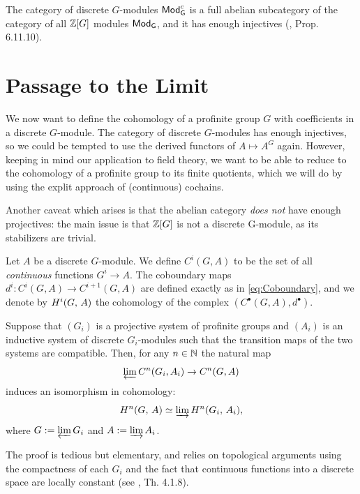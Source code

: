 \documentclass[a4paper, oneside]{memoir}
\begin{document}
\noindent The category of discrete $G$-modules $\mathsf{Mod}_\mathsf{G}^{c}$ is a full abelian subcategory of the category of all $\mathbb{Z}[G]$ modules $\mathsf{Mod}_\mathsf{G}$, and it has enough injectives (\cite{Weibel}, Prop. 6.11.10).


\section{Passage to the Limit}

We now want to define the cohomology of a profinite group $G$ with coefficients in a discrete $G$-module. The category of discrete $G$-modules has enough injectives, so we could be tempted to use the derived functors of $A\mapsto A^G$ again. However, keeping in mind our application to field theory, we want to be able to reduce to the cohomology of a profinite group to its finite quotients, which we will do by using the explit approach of (continuous) cochains.

\begin{remark}
	Another caveat which arises is that the abelian category  \textit{does not} have enough projectives: the main issue is that $\mathbb{Z}[G]$ is not a discrete G-module, as its stabilizers are trivial.
\end{remark}

\begin{definition}
	Let $A$ be a discrete $G$-module. We define $C^i(G,A)$ to be the set of all \textit{continuous} functions $G^i\to A$. The coboundary maps $d^i: C^i(G,A)\to C^{i+1}(G,A)$ are defined exactly as in \eqref{eq:Coboundary}, and we denote by $H^{i}( G, \, A )$ the cohomology of the complex $(C^\bullet(G,A),d^\bullet)$.
\end{definition}

\begin{theorem}\label{thm:IndLim}
	Suppose that $(G_i)$ is a projective system of profinite groups and $(A_i)$ is an inductive system of discrete $G_i$-modules such that the transition maps of the two systems are compatible. Then, for any $n\in\mathbb{N}$ the natural map
	\[
		\varprojlim{C^n(G_i,A_i)}\to C^n(G,A)
	\]
	induces an isomorphism in cohomology:
	\[
		H^{n}( G, \, A )\simeq \varinjlim{H^{n}( G_i, \, A_i )},
	\]
	where $G:=\varprojlim{G_i}$ and $A:=\varinjlim{A_i}$.
\end{theorem}
The proof is tedious but elementary, and relies on topological arguments using the compactness of each $G_i$ and the fact that continuous functions into a discrete space are locally constant (see \cite{Harari}, Th. 4.1.8).
\end{document}
